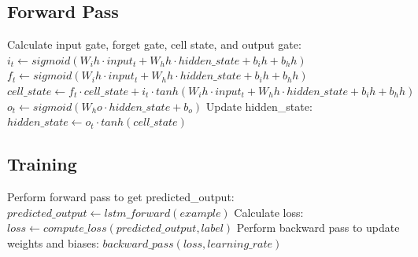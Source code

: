 \documentclass[./main.tex]{subfiles}
\begin{document}
\subsection*{Forward Pass}
\begin{algorithmic}
    \State Calculate input gate, forget gate, cell state, and output gate:
    \State $i_t \gets sigmoid(W_ih \cdot input_t + W_hh \cdot hidden\_state + b_ih + b_hh)$
    \State $f_t \gets sigmoid(W_ih \cdot input_t + W_hh \cdot hidden\_state + b_ih + b_hh)$
    \State $cell\_state \gets f_t \cdot cell\_state + i_t \cdot tanh(W_ih \cdot input_t + W_hh \cdot hidden\_state + b_ih + b_hh)$
    \State $o_t \gets sigmoid(W_ho \cdot hidden\_state + b_o)$
    \State Update hidden\_state:
    \State $hidden\_state \gets o_t \cdot tanh(cell\_state)$
  \EndFor
\end{algorithmic}

\subsection*{Training}
\begin{algorithmic}
      \State Perform forward pass to get predicted\_output:
      \State $predicted\_output \gets lstm\_forward(example)$
      \State Calculate loss:
      \State $loss \gets compute\_loss(predicted\_output, label)$
      \State Perform backward pass to update weights and biases:
      \State $backward\_pass(loss, learning\_rate)$
    \EndFor
  \EndFor
\end{algorithmic}
\end{document}
